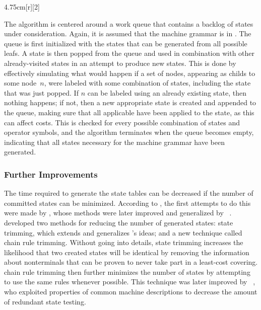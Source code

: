 {\begin{inParFigure}{4.75cm}[r][2]%
  \centering%

  \vspace{0.85\baselineskip}


  \vspace{0.75\baselineskip}
\end{inParFigure}%
The algorithm is centered around a work queue that contains a backlog of
\glspl{state} under consideration.
%
Again, it is assumed that the
\gls{machine grammar} is in .
%
The queue is
first initialized with the \glspl{state} that can be generated from all possible
\glspl{leaf}.
%
A \gls{state} is then popped from the queue and used in
combination with other already-visited \glspl{state} in an attempt to produce
new \glspl{state}.
%
This is done by effectively simulating what would happen if a
set of \glspl{node}, appearing as \glspl{child} to some node~$n$, were labeled
with some combination of \glspl{state}, including the \gls{state} that was just
popped.
%
If $n$ can be labeled using an already existing \gls{state}, then
nothing happens; if not, then a new appropriate \gls{state} is created and
appended to the queue, making sure that all applicable \tchainRules have been
applied to the \gls{state}, as this can affect costs.
%
This is checked for every
possible combination of \glspl{state} and operator \glspl{symbol}, and the
algorithm terminates when the queue becomes empty, indicating that all
\glspl{state} necessary for the \gls{machine grammar} have been
generated.


\subsubsection{Further Improvements}

The time required to generate the \gls{state} tables can be decreased if the
number of committed \glspl{state} can be minimized.
%
According to
\textcite{Proebsting1992b}, the first attempts to do this were made by
\textcite{Henry1989}, whose methods were later improved and generalized by
\citeauthor{Proebsting1992b}~\cite{Proebsting1992b,
  Proebsting1995a}.
%
\citeauthor{Proebsting1992b} developed two methods for
reducing the number of generated \glspl{state}: \gls{state trimming}, which
extends and generalizes \citeauthor{Henry1989}'s ideas; and a new technique
called \gls{chain rule trimming}.
%
Without going into details, \gls{state
  trimming} increases the likelihood that two created \glspl{state} will be
identical by removing the information about \glspl{nonterminal} that can be
proven to never take part in a least-cost covering.
%
\Gls{chain rule trimming}
then further minimizes the number of \glspl{state} by attempting to use the same
\glspl{rule} whenever possible.
%
This technique was later improved by
\citeauthor{Kang1995}~\cite{Kang1995, Kang2004}, who exploited properties of
common \glspl{machine description} to decrease the amount of redundant
\gls{state} testing.


}
